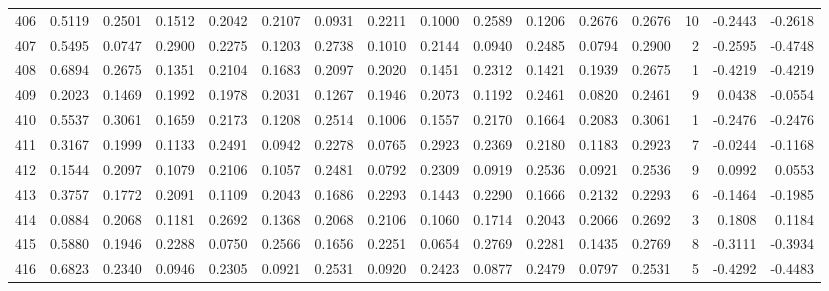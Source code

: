 \begin{tabular}{lrrrrrrrrrrrrrrr}
406 &      0.5119 &  0.2501 &  0.1512 &  0.2042 &  0.2107 &  0.0931 &  0.2211 &  0.1000 &  0.2589 &  0.1206 &   0.2676 &     0.2676 &     10 &                   -0.2443 &                    -0.2618 \\
407 &      0.5495 &  0.0747 &  0.2900 &  0.2275 &  0.1203 &  0.2738 &  0.1010 &  0.2144 &  0.0940 &  0.2485 &   0.0794 &     0.2900 &      2 &                   -0.2595 &                    -0.4748 \\
408 &      0.6894 &  0.2675 &  0.1351 &  0.2104 &  0.1683 &  0.2097 &  0.2020 &  0.1451 &  0.2312 &  0.1421 &   0.1939 &     0.2675 &      1 &                   -0.4219 &                    -0.4219 \\
409 &      0.2023 &  0.1469 &  0.1992 &  0.1978 &  0.2031 &  0.1267 &  0.1946 &  0.2073 &  0.1192 &  0.2461 &   0.0820 &     0.2461 &      9 &                    0.0438 &                    -0.0554 \\
410 &      0.5537 &  0.3061 &  0.1659 &  0.2173 &  0.1208 &  0.2514 &  0.1006 &  0.1557 &  0.2170 &  0.1664 &   0.2083 &     0.3061 &      1 &                   -0.2476 &                    -0.2476 \\
411 &      0.3167 &  0.1999 &  0.1133 &  0.2491 &  0.0942 &  0.2278 &  0.0765 &  0.2923 &  0.2369 &  0.2180 &   0.1183 &     0.2923 &      7 &                   -0.0244 &                    -0.1168 \\
412 &      0.1544 &  0.2097 &  0.1079 &  0.2106 &  0.1057 &  0.2481 &  0.0792 &  0.2309 &  0.0919 &  0.2536 &   0.0921 &     0.2536 &      9 &                    0.0992 &                     0.0553 \\
413 &      0.3757 &  0.1772 &  0.2091 &  0.1109 &  0.2043 &  0.1686 &  0.2293 &  0.1443 &  0.2290 &  0.1666 &   0.2132 &     0.2293 &      6 &                   -0.1464 &                    -0.1985 \\
414 &      0.0884 &  0.2068 &  0.1181 &  0.2692 &  0.1368 &  0.2068 &  0.2106 &  0.1060 &  0.1714 &  0.2043 &   0.2066 &     0.2692 &      3 &                    0.1808 &                     0.1184 \\
415 &      0.5880 &  0.1946 &  0.2288 &  0.0750 &  0.2566 &  0.1656 &  0.2251 &  0.0654 &  0.2769 &  0.2281 &   0.1435 &     0.2769 &      8 &                   -0.3111 &                    -0.3934 \\
416 &      0.6823 &  0.2340 &  0.0946 &  0.2305 &  0.0921 &  0.2531 &  0.0920 &  0.2423 &  0.0877 &  0.2479 &   0.0797 &     0.2531 &      5 &                   -0.4292 &                    -0.4483 \\

\end{tabular}
